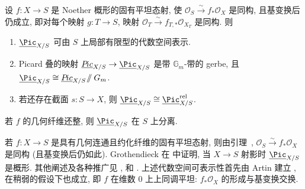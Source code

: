 \begin{proposition}\label{src:7.4.62}
设 $f:X\to S$ 是 Noether 概形的固有平坦态射, 使 $\mathcal O_S\xrightarrow{\sim}f_*\mathcal O_X$ 是同构, 且基变换后仍成立, 即对每个映射 $g:T\to S$, 映射 $\mathcal O_T\xrightarrow{\sim}f_{T,*}\mathcal O_{X_T}$ 是同构. 则
\begin{enumerate}[(1)]
\item $\underline{\Pic}_{X/S}$ 可由 $S$ 上局部有限型的代数空间表示.
\item Picard 叠的映射 $\underline{\mathcal P\!ic}_{X/S}\to\underline{\Pic}_{X/S}$ 是带 $\mathbb G_m$-带的 gerbe, 且 $\underline{\Pic}_{X/S}\cong\underline{\mathcal P\!ic}_{X/S}\!\sslash\mathbb G_m$.
\item 若还存在截面 $s:S\to X$, 则 $\underline{\Pic}_{X/S}\cong\underline{\Pic}_{X/S}^{\mathrm{rel}}$.
\end{enumerate}
若 $f$ 的几何纤维还整, 则 $\underline{\Pic}_{X/S}$ 在 $S$ 上分离.
\end{proposition}
\begin{remark}\label{src:7.4.63}
若 $f:X\to S$ 是具有几何连通且约化纤维的固有平坦态射, 则由引理~, $\mathcal O_S\xrightarrow{\sim}f_*\mathcal O_X$ 是同构 (且基变换后仍如此). Grothendieck 在 \cite[定理 3.1]{FGAV} 中证明, 当 $X\to S$ 射影时 $\underline{\Pic}_{X/S}$ 是概形. 其他阐述及各种推广见 \cite[\S20--21]{Mum66a}, \cite{AK80} 和 \cite[\S9.4]{Kle05}. 上述代数空间可表示性首先由 Artin 建立 \cite[定理 7.3]{Art69b}, 在稍弱的假设下也成立, 即 $f$ 在维数 $0$ 上上同调平坦: $f_*\mathcal O_X$ 的形成与基变换交换.
\end{remark}
